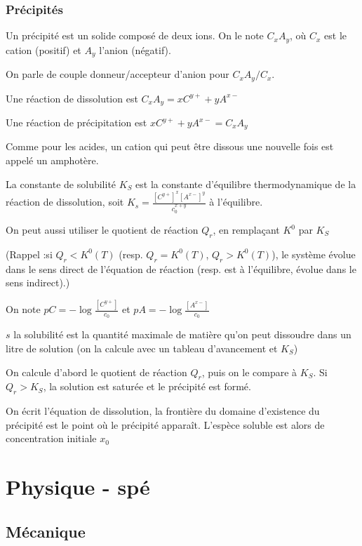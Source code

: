 \documentclass[a4paper,12pt]{book}
\newcommand{\Def}[2]{\begin{tcolorbox}[colback=white,colframe=red!10!green!20!blue!75!, title=Définition : #1]#2\end{tcolorbox}}
\newcommand{\Meth}[2]{\begin{tcolorbox}[colback=white,colframe=green!60!green!30!black!75, title=Méthode :  #1]#2\end{tcolorbox}}
\begin{document}
\subsection{Précipités}
\Def{}{Un précipité est un solide composé de deux ions. On le note $C_xA_y$, où $C_x$ est le cation (positif) et $A_y$ l'anion (négatif).
\par On parle de couple donneur/accepteur d'anion pour $C_xA_y/C_x$.
\par Une réaction de dissolution est $C_xA_y = xC^{y+} + yA^{x-}$
\par Une réaction de précipitation est $xC^{y+}+yA^{x-} = C_xA_y$}
Comme pour les acides, un cation qui peut être dissous une nouvelle fois est appelé un amphotère.
\Def{}{La constante de solubilité $K_S$ est la constante d'équilibre thermodynamique de la réaction de dissolution, soit $K_s = \frac{[C^{y+}]^x[A^{x-}]^y}{c_0^{x+y}}$ à l'équilibre.
\par On peut aussi utiliser le quotient de réaction $Q_r$, en remplaçant $K^0$ par $K_S$
\par (Rappel :si $Q_r<K^0(T)$ (resp. $Q_r=K^0(T)$, $Q_r>K^0(T)$), le système évolue dans le sens direct de l'équation de réaction (resp. est à l'équilibre, évolue dans le sens indirect).) 
\par On note $pC = -\log\frac{[C^{y+}]}{c_0}$ et $pA = -\log\frac{[A^{x-}]}{c_0}$
\par $s$ la solubilité est la quantité maximale de matière qu'on peut dissoudre dans un litre de solution (on la calcule avec un tableau d'avancement et $K_S$)}
\Meth{Utiliser la condition de précipitation}{On calcule d'abord le quotient de réaction $Q_r$, puis on le compare à $K_S$. Si $Q_r>K_S$, la solution est saturée et le précipité est formé.}
\Meth{Diagramme d'existence}{On écrit l'équation de dissolution, la frontière du domaine d'existence du précipité est le point où le précipité apparaît. L'espèce soluble est alors de concentration initiale $x_0$}





\chapter{Physique - spé}
\section{Mécanique}
\end{document}
